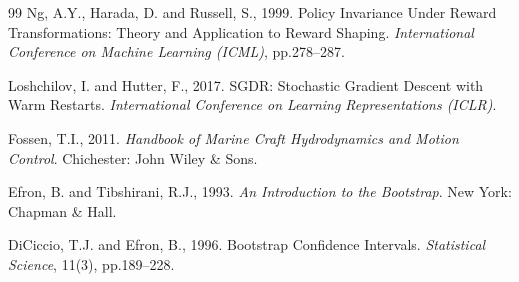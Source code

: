 \begin{thebibliography}{99}
Ng, A.Y., Harada, D. and Russell, S., 1999.
Policy Invariance Under Reward Transformations: Theory and Application to
Reward Shaping.
\textit{International Conference on Machine Learning (ICML)}, pp.278--287.

Loshchilov, I. and Hutter, F., 2017.
SGDR: Stochastic Gradient Descent with Warm Restarts.
\textit{International Conference on Learning Representations (ICLR)}.

Fossen, T.I., 2011.
\textit{Handbook of Marine Craft Hydrodynamics and Motion Control}.
Chichester: John Wiley \& Sons.

Efron, B. and Tibshirani, R.J., 1993.
\textit{An Introduction to the Bootstrap}. New York: Chapman \& Hall.

DiCiccio, T.J. and Efron, B., 1996.
Bootstrap Confidence Intervals.
\textit{Statistical Science}, 11(3), pp.189--228.

\end{thebibliography}
